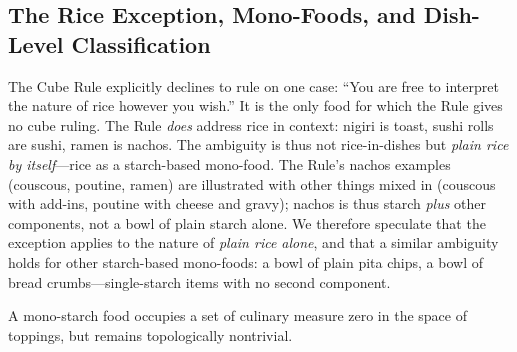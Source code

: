 \subsection{The Rice Exception, Mono-Foods, and Dish-Level Classification}

The Cube Rule explicitly declines to rule on one case: ``You are free to interpret the nature of rice however you wish.'' It is the only food for which the Rule gives no cube ruling.
The Rule \emph{does} address rice in context: nigiri is toast, sushi rolls are sushi, ramen is nachos.
The ambiguity is thus not rice-in-dishes but \emph{plain rice by itself}---rice as a starch-based mono-food.
The Rule's nachos examples (couscous, poutine, ramen) are illustrated with other things mixed in (couscous with add-ins, poutine with cheese and gravy); nachos is thus starch \emph{plus} other components, not a bowl of plain starch alone.
We therefore speculate that the exception applies to the nature of \emph{plain rice alone}, and that a similar ambiguity holds for other starch-based mono-foods: a bowl of plain pita chips, a bowl of bread crumbs---single-starch items with no second component.
\begin{definition}
A mono-starch food occupies a set of culinary measure zero in the space of toppings, but remains topologically nontrivial.
\end{definition}

